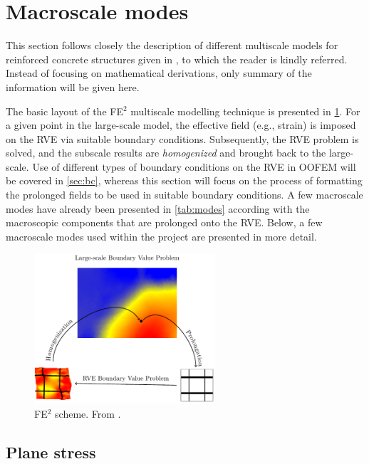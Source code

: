 \documentclass[11pt]{article}
\begin{document}
\clearpage
\section{Macroscale modes}
\label{sec:homogenization}

This section follows closely the description of different multiscale models for reinforced concrete structures given in \cite{Sciegaj2020phd}, to which the reader is kindly referred. 
Instead of focusing on mathematical derivations, only summary of the information will be given here. 

The basic layout of the FE$^2$ multiscale modelling technique is presented in \cref{fig:fe2}. For a given point in the large-scale model, the effective field (e.g., strain) is imposed on the RVE via suitable boundary conditions. 
Subsequently, the RVE problem is solved, and the subscale results are \textit{homogenized} and brought back to the large-scale. 
Use of different types of boundary conditions on the RVE in OOFEM will be covered in \cref{sec:bc}, whereas this section will focus on the process of formatting the prolonged fields to be used in suitable boundary conditions. 
A few macroscale modes have already been presented in \cref{tab:modes} according with the macroscopic components that are prolonged onto the RVE. Below, a few macroscale modes used within the project are presented in more detail. 

\begin{figure}[H]
    \centering
    \includegraphics[width=0.6\textwidth]{img/fe2.pdf}
    \caption{FE$^2$ scheme. From \cite{Sciegaj2020phd}.}
    \label{fig:fe2}
\end{figure}

\subsection{Plane stress} 
\end{document}

